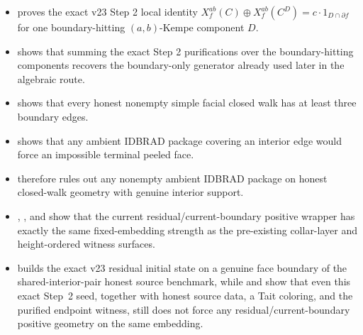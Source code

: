 \documentclass[11pt]{article}
\begin{document}
\begin{itemize}[leftmargin=2em]
\item {} proves the exact v23 Step 2
local identity
\(
X_f^{ab}(C) \oplus X_f^{ab}(C^D) = c \cdot 1_{D \cap \partial f}
\)
for one boundary-hitting \((a,b)\)-Kempe component \(D\).
\item {}
shows that summing the exact Step 2 purifications over the boundary-hitting
components recovers the boundary-only generator already used later in the
algebraic route.
\item {}
shows that every honest nonempty simple facial closed walk has at least three
boundary edges.
\item {}
shows that any ambient IDBRAD package covering an interior edge would force an
impossible terminal peeled face.
\item {}
therefore rules out any nonempty ambient IDBRAD package on honest closed-walk
geometry with genuine interior support.
\item
{},
,
and
show that the current residual/current-boundary positive wrapper has exactly
the same fixed-embedding strength as the pre-existing collar-layer and
height-ordered witness surfaces.
\item
{}
builds the exact v23 residual initial state on a genuine face boundary of the
shared-interior-pair honest source benchmark, while
and
show that even this exact Step~2 seed, together with honest source data, a
Tait coloring, and the purified endpoint witness, still does not force any
residual/current-boundary positive geometry on the same embedding.
\end{itemize}
\end{document}
